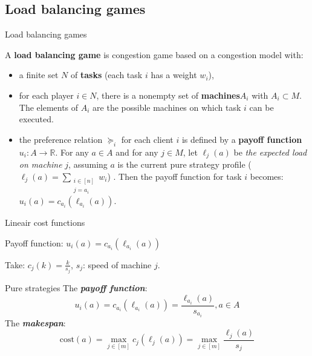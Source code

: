 \documentclass{beamer}
\newcommand{\R}{\mathbb{R}}
\newcommand{\cost}{\text{cost}}
\begin{document}
\subsection{Load balancing games}
\begin{frame}{Load balancing games}
\begin{definition}
A \textbf{load balancing game} is congestion game based on a congestion model with:
\begin{itemize}
  \item a finite set $N$ of \textbf{tasks} (each task $i$ has a weight $w_i$),
  \item for each player $i \in N$, there is a nonempty set of \textbf{machines}$A_i$ with $A_i \subset M$. The elements of $A_i$ are the possible machines on which task $i$ can be executed.
  \item the preference relation $\succeq_i$ for each client $i$ is defined by a \textbf{payoff function} $u_i: A \rightarrow \R$. For any $a \in A$ and for any $j \in M$, let $\ell_j(a)$ be \emph{the expected load on machine} $j$, assuming $a$ is the current pure strategy profile ($\ell_j(a) = \sum_{\substack{i \in [n]\\j = a_i}}{w_i}$) . Then the payoff function for task $i$ becomes: $u_i(a) = c_{a_i}(\ell_{a_i}(a))$.
\end{itemize}
\end{definition}
\end{frame}
\begin{frame}{Lineair cost functions}
\begin{block}{}
\begin{center}
Payoff function: $u_i(a) = c_{a_i}(\ell_{a_i}(a))$
\end{center}
\end{block}
\begin{block}{}
\begin{center}
Take: $c_{j}(k) = \frac{k}{s_j}$, $s_j$: speed of machine $j$.
\end{center}
\end{block}

\begin{block}{Pure strategies}
The \textbf{\emph{payoff function}}:
$$u_i(a) = c_{a_i}(\ell_{a_i}(a)) =  \frac{\ell_{a_i}(a)}{s_{a_i}}, a \in A$$
The \emph{\textbf{makespan}}: $$\cost(a)=\max_{j\in[m]}{c_j(\ell_j(a))} = \max_{j\in[m]}{\frac{\ell_{j}(a)}{s_{j}}}$$
\end{block}

\end{frame}
\end{document}
